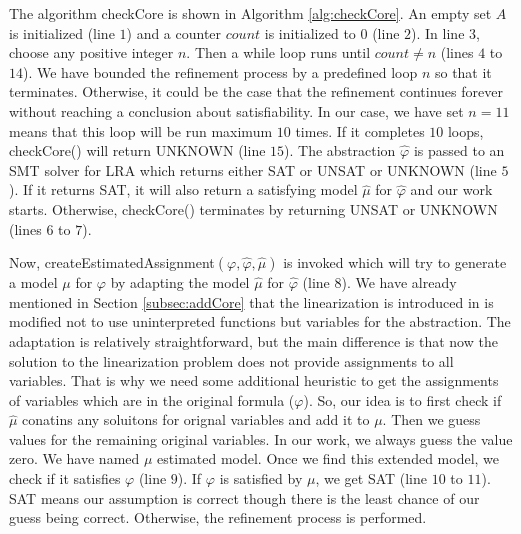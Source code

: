 \noindent The algorithm checkCore is shown in Algorithm \ref{alg:checkCore}.
An empty set $A$ is initialized (line $1$) and a counter $count$ is initialized to 0 (line $2$).
In line $3$, choose any positive integer $n$.
Then a while loop runs until $count \neq n$ (lines $4$ to $14$).
We have bounded the refinement process by a predefined loop $n$ so that it terminates.
Otherwise, it could be the case that the refinement continues forever without reaching a conclusion about satisfiability.
In our case, we have set $n = 11$ means that this loop will be run maximum $10$ times.
If it completes $10$ loops, checkCore() will return UNKNOWN (line $15$).
The abstraction $\hat{\varphi}$ is passed to an SMT solver for LRA which returns either SAT or UNSAT or UNKNOWN (line $5$).
If it returns SAT, it will also return a satisfying model $\hat{\mu}$ for $\hat{\varphi}$ and our work starts.
Otherwise, checkCore() terminates by returning UNSAT or UNKNOWN (lines $6$ to $7$).\newline

\noindent Now, createEstimatedAssignment$(\varphi, \hat{\varphi}, \hat{\mu})$ is invoked which will try to generate a model $\mu$ for $\varphi$ by adapting the model $\hat{\mu}$ for $\hat{\varphi}$ (line $8$).
We have already mentioned in Section \ref{subsec:addCore} that the linearization is introduced in \cite{Cimatti:2018:ILS:3274693.3230639} is modified not to use uninterpreted functions but variables for the abstraction.
The adaptation is relatively straightforward, but the main difference is that now the solution to the linearization problem does not provide assignments to all variables.
That is why we need some additional heuristic to get the assignments of variables which are in the original formula ($\varphi$).
So, our idea is to first check if $\hat{\mu}$ conatins any soluitons for orignal variables and add it to $\mu$.
Then we guess values for the remaining original variables.
In our work, we always guess the value zero.
We have named $\mu$ estimated model.
Once we find this extended model, we check if it satisfies $\varphi$ (line $9$).
If $\varphi$ is satisfied by $\mu$, we get SAT (line $10$ to $11$).
SAT means our assumption is correct though there is the least chance of our guess being correct.
Otherwise, the refinement process is performed.\newline

